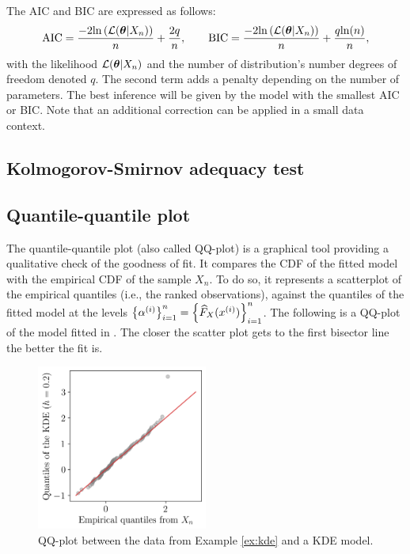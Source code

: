 The AIC and BIC are expressed as follows:
\begin{equation}
    \textrm{AIC} = \frac{-2 \mathrm{ln}\left(\mathcal{L}({\boldsymbol{\theta}}|X_n)\right)}{n} + \frac{2 q}{n},\qquad
    \textrm{BIC} = \frac{-2 \mathrm{ln}\left(\mathcal{L}({\boldsymbol{\theta}}|X_n)\right)}{n} + \frac{q \mathrm{ln}(n)}{n},
\end{equation}
with the likelihood $\mathcal{L}({\boldsymbol{\theta}}|X_n)$ and the number of distribution's number degrees of freedom denoted $q$.
The second term adds a penalty depending on the number of parameters. 
The best inference will be given by the model with the smallest AIC or BIC. 
Note that an additional correction can be applied in a small data context.

\subsection*{Kolmogorov-Smirnov adequacy test}



\subsection*{Quantile-quantile plot}

The quantile-quantile plot (also called QQ-plot) is a graphical tool providing a qualitative check of the goodness of fit.
It compares the CDF of the fitted model with the empirical CDF of the sample $X_n$.
To do so, it represents a scatterplot of the empirical quantiles (i.e., the ranked observations), against the quantiles of the fitted model at the levels 
$\left\{\alpha^{(i)}\right\}_{i=1}^n = \left\{\widehat{F}_X(x^{(i)})\right\}_{i=1}^n$.
The following  is a QQ-plot of the model fitted in . The closer the scatter plot gets to the first bisector line the better the fit is.

\begin{figure}[ht]
    \centering
    \includegraphics[width=0.5\textwidth]{../numerical_experiments/chapter1/figures/qqplot.png}
    \caption{QQ-plot between the data from Example \ref{ex:kde} and a KDE model.}
    \label{fig:qqplot_kde}
\end{figure}



